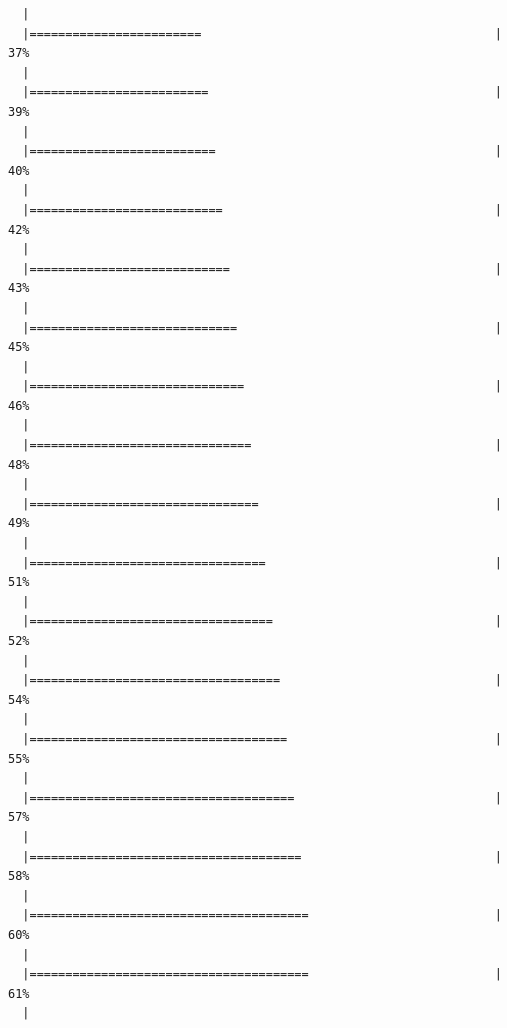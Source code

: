 \documentclass[]{book}
\begin{document}
\begin{verbatim}
  |                                                                       
  |========================                                         |  37%
  |                                                                       
  |=========================                                        |  39%
  |                                                                       
  |==========================                                       |  40%
  |                                                                       
  |===========================                                      |  42%
  |                                                                       
  |============================                                     |  43%
  |                                                                       
  |=============================                                    |  45%
  |                                                                       
  |==============================                                   |  46%
  |                                                                       
  |===============================                                  |  48%
  |                                                                       
  |================================                                 |  49%
  |                                                                       
  |=================================                                |  51%
  |                                                                       
  |==================================                               |  52%
  |                                                                       
  |===================================                              |  54%
  |                                                                       
  |====================================                             |  55%
  |                                                                       
  |=====================================                            |  57%
  |                                                                       
  |======================================                           |  58%
  |                                                                       
  |=======================================                          |  60%
  |                                                                       
  |=======================================                          |  61%
  |                                                                       

\end{verbatim}
\end{document}
